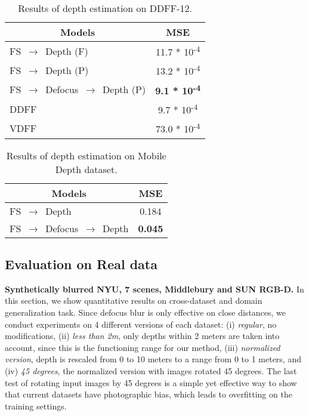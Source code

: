 \documentclass[10pt,twocolumn,letterpaper]{article}
\begin{document}
\begin{table}[]
\begin{center}
\begin{tabular}{l|c}
\hline
\multicolumn{1}{c|}{Models}      & MSE                 \\ \hline
FS $\,\to\,$ Depth (F)          & 11.7 * 10\textsuperscript{-4}          \\
FS $\,\to\,$ Depth (P)            & 13.2 * 10\textsuperscript{-4} \\
FS $\,\to\,$ Defocus $\,\to\,$ Depth (P) & \textbf{9.1 * 10\textsuperscript{-4}}          \\
DDFF \cite{Hazirbas18} & 9.7 * 10\textsuperscript{-4}    \\
VDFF \cite{Moeller2015} & 73.0 * 10\textsuperscript{-4}            \\\hline
\end{tabular}
\end{center}
\vspace{-0.2cm}
\caption{Results of depth estimation on DDFF-12.}
\label{table:RealDDFF}
\end{table} \begin{table}[]
\begin{center}
\begin{tabular}{l|c}
\hline
\multicolumn{1}{c|}{Models}    & MSE         \\ \hline
FS $\,\to\,$ Depth            & 0.184          \\
FS $\,\to\,$ Defocus $\,\to\,$ Depth & \textbf{0.045} \\ \hline
\end{tabular}
\end{center}
\vspace{-0.2cm}
\caption{Results of depth estimation on Mobile Depth dataset.}
\label{table:RealMobileDepth}
\end{table} 
\vspace{-1em}
\subsection{Evaluation on Real data}


\noindent\textbf{Synthetically blurred NYU, 7 scenes, Middlebury and SUN RGB-D.}
In this section, we show quantitative results on cross-dataset and domain generalization task. 
Since defocus blur is only effective on close distances, we conduct experiments on 4 different versions of each dataset: (i) {\it regular}, no modifications, (ii) {\it less than 2m}, only depths within 2 meters are taken into account, since this is the functioning range for our method, (iii) {\it normalized version}, depth is rescaled from 0 to 10 meters to a range from 0 to 1 meters, and (iv) {\it 45 degrees}, the normalized version with images rotated 45 degrees. 
The last test of rotating input images by 45 degrees is a simple yet effective way to show that current datasets have photographic bias, which leads to overfitting on the training settings.
\end{document}
